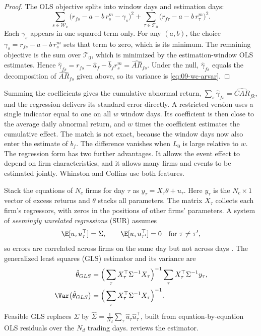 \begin{proof}
The OLS objective splits into window days and estimation days:
\begin{equation*}
\sum_{s\in\mathcal{W}_k}\big(r_{fs}-a-b\,r^m_s-\gamma_{s}\big)^2
+\sum_{\tau\in\mathcal{T}_0}\big(r_{f\tau}-a-b\,r^m_\tau\big)^2 .
\end{equation*}
Each $\gamma_s$ appears in one squared term only. For any $(a,b)$, the choice
$\gamma_s=r_{fs}-a-b\,r^m_s$ sets that term to zero, which is its minimum. The remaining objective is
the sum over $\mathcal{T}_0$, which is minimized by the estimation-window OLS estimates. Hence
$\hat\gamma_{fs}=r_{fs}-\hat a_f-\hat b_f r^m_s=\widehat{AR}_{fs}$. Under the null, $\hat\gamma_{fs}$
equals the decomposition of $\widehat{AR}_{fs}$ given above, so its variance is
\eqref{eq:09-wc-arvar}.
\end{proof}

Summing the coefficients gives the cumulative abnormal return, $\sum_s\hat\gamma_{fs}=\widehat{CAR}_{fk}$,
and the regression delivers its standard error directly. A restricted version uses a single
indicator equal to one on all $w$ window days. Its coefficient is then close to the average daily
abnormal return, and $w$ times the coefficient estimates the cumulative effect. The match is not
exact, because the window days now also enter the estimate of $b_f$. The difference vanishes when
$L_0$ is large relative to $w$. The regression form has two further advantages. It allows the event
effect to depend on firm characteristics, and it allows many firms and events to be estimated jointly.
Whinston and Collins use both features.

Stack the equations of $N_c$ firms for day $\tau$ as $y_\tau=X_\tau\theta+u_\tau$. Here $y_\tau$ is
the $N_c\times1$ vector of excess returns and $\theta$ stacks all parameters. The matrix $X_\tau$
collects each firm's regressors, with zeros in the positions of other firms' parameters. A system of
\emph{seemingly unrelated regressions} (SUR) assumes
\begin{equation*}
\E[u_\tau u_\tau^\top]=\Sigma,\qquad \E[u_\tau u_{\tau'}^\top]=0\quad\text{for }\tau\neq\tau',
\end{equation*}
so errors are correlated across firms on the same day but not across days \citep{Zellner1962}. The
generalized least squares (GLS) estimator and its variance are
\begin{align*}
\hat\theta_{GLS} &= \Big(\sum_\tau X_\tau^\top\Sigma^{-1}X_\tau\Big)^{-1}
                    \sum_\tau X_\tau^\top\Sigma^{-1}y_\tau,\\
\Var\big(\hat\theta_{GLS}\big) &= \Big(\sum_\tau X_\tau^\top\Sigma^{-1}X_\tau\Big)^{-1}.
\end{align*}
Feasible GLS replaces $\Sigma$ by $\hat\Sigma=\frac{1}{N_d}\sum_\tau\hat u_\tau\hat u_\tau^\top$,
built from equation-by-equation OLS residuals over the $N_d$ trading days.  reviews the
estimator.

